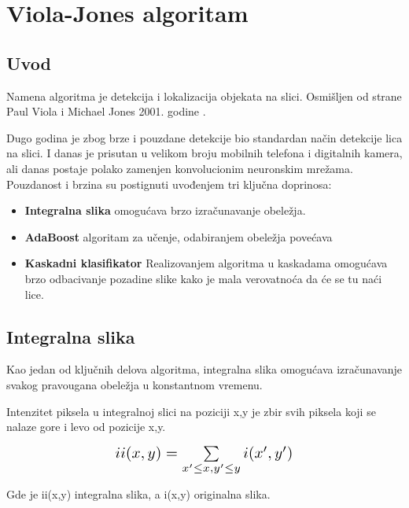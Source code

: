 \section{Viola-Jones algoritam}

\subsection{Uvod}

Namena algoritma je detekcija i lokalizacija objekata na slici. Osmišljen od
strane Paul Viola i Michael Jones 2001. godine \cite{DUMMY}.

Dugo godina je zbog brze i pouzdane detekcije bio standardan način detekcije
lica na slici. I danas je prisutan u velikom broju mobilnih telefona i
digitalnih kamera, ali danas postaje polako zamenjen konvolucionim neuronskim
mrežama. \\

Pouzdanost i brzina su postignuti uvođenjem tri ključna doprinosa:
\begin{itemize}

\item \textbf{Integralna slika} omogućava brzo izračunavanje obeležja.
\item \textbf{AdaBoost} algoritam za učenje, odabiranjem obeležja povećava
\item \textbf{Kaskadni klasifikator} Realizovanjem algoritma u kaskadama
  omogućava brzo odbacivanje pozadine slike kako je mala verovatnoća da će se tu
  naći lice. \\
\end{itemize}


\subsection{Integralna slika}

Kao jedan od ključnih delova algoritma, integralna slika omogućava izračunavanje
svakog pravougana obeležja u konstantnom vremenu.

Intenzitet piksela u integralnoj slici na poziciji x,y je zbir svih piksela koji
se nalaze gore i levo od pozicije x,y.

\begin{equation}
  \Scale[1.4]{ii(x,y)=\sum\limits_{x'\leq x, y'\leq y} i(x',y')}
  \label{IntegralImage_eq1}
\end{equation}

Gde je ii(x,y) integralna slika, a i(x,y) originalna slika. \\

